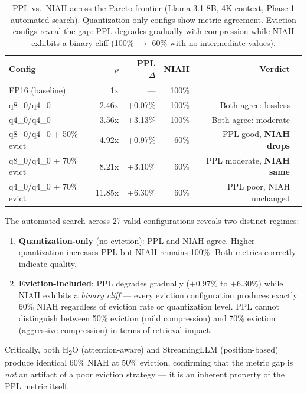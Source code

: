 \begin{table}[h]
\centering
\begin{tabular}{lrrrrl}
\toprule
\textbf{Config} & \textbf{$\rho$} & \textbf{PPL $\Delta$} & \textbf{NIAH} & \textbf{Verdict} \\
\midrule
FP16 (baseline) & 1x & --- & 100\% & \\
q8\_0/q4\_0 & 2.46x & +0.07\% & 100\% & Both agree: lossless \\
q4\_0/q4\_0 & 3.56x & +3.13\% & 100\% & Both agree: moderate \\
\midrule
q8\_0/q4\_0 + 50\% evict & 4.92x & +0.97\% & 60\% & PPL good, \textbf{NIAH drops} \\
q8\_0/q4\_0 + 70\% evict & 8.21x & +3.10\% & 60\% & PPL moderate, \textbf{NIAH same} \\
q4\_0/q4\_0 + 70\% evict & 11.85x & +6.30\% & 60\% & PPL poor, NIAH unchanged \\
\bottomrule
\end{tabular}
\caption{PPL vs.\ NIAH across the Pareto frontier (Llama-3.1-8B, 4K context, Phase 1 automated search). Quantization-only configs show metric agreement. Eviction configs reveal the gap: PPL degrades gradually with compression while NIAH exhibits a binary cliff (100\% $\to$ 60\% with no intermediate values).}
\label{tab:ppl-vs-task}
\end{table}

The automated search across 27 valid configurations reveals two distinct regimes:
\begin{enumerate}
    \item \textbf{Quantization-only} (no eviction): PPL and NIAH agree. Higher quantization increases PPL but NIAH remains 100\%. Both metrics correctly indicate quality.
    \item \textbf{Eviction-included}: PPL degrades gradually ($+$0.97\% to $+$6.30\%) while NIAH exhibits a \emph{binary cliff} --- every eviction configuration produces exactly 60\% NIAH regardless of eviction rate or quantization level. PPL cannot distinguish between 50\% eviction (mild compression) and 70\% eviction (aggressive compression) in terms of retrieval impact.
\end{enumerate}

Critically, both H\textsubscript{2}O (attention-aware) and StreamingLLM (position-based) produce identical 60\% NIAH at 50\% eviction, confirming that the metric gap is \emph{not} an artifact of a poor eviction strategy --- it is an inherent property of the PPL metric itself.

